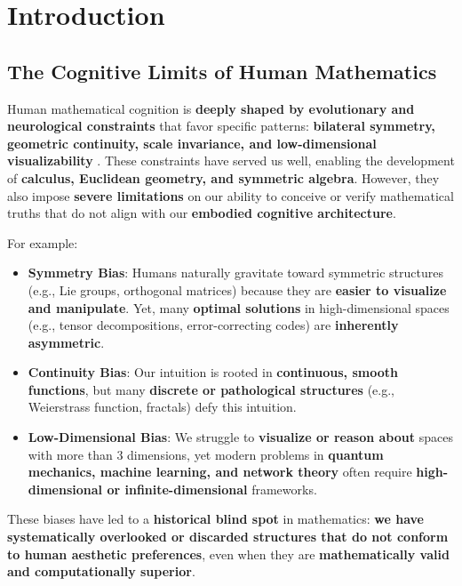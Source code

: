 \documentclass[11pt, a4paper]{article}
\begin{document}
\section{Introduction}

\subsection{The Cognitive Limits of Human Mathematics}
Human mathematical cognition is \textbf{deeply shaped by evolutionary and neurological constraints} that favor specific patterns: \textbf{bilateral symmetry, geometric continuity, scale invariance, and low-dimensional visualizability} \cite{lakoff2000where}. These constraints have served us well, enabling the development of \textbf{calculus, Euclidean geometry, and symmetric algebra}. However, they also impose \textbf{severe limitations} on our ability to conceive or verify mathematical truths that do not align with our \textbf{embodied cognitive architecture}.

For example:
\begin{itemize}
    \item \textbf{Symmetry Bias}: Humans naturally gravitate toward symmetric structures (e.g., Lie groups, orthogonal matrices) because they are \textbf{easier to visualize and manipulate}. Yet, many \textbf{optimal solutions} in high-dimensional spaces (e.g., tensor decompositions, error-correcting codes) are \textbf{inherently asymmetric}.
    \item \textbf{Continuity Bias}: Our intuition is rooted in \textbf{continuous, smooth functions}, but many \textbf{discrete or pathological structures} (e.g., Weierstrass function, fractals) defy this intuition.
    \item \textbf{Low-Dimensional Bias}: We struggle to \textbf{visualize or reason about} spaces with more than 3 dimensions, yet modern problems in \textbf{quantum mechanics, machine learning, and network theory} often require \textbf{high-dimensional or infinite-dimensional} frameworks.
\end{itemize}

These biases have led to a \textbf{historical blind spot} in mathematics: \textbf{we have systematically overlooked or discarded structures that do not conform to human aesthetic preferences}, even when they are \textbf{mathematically valid and computationally superior}.
\end{document}
